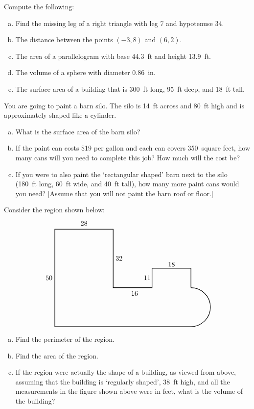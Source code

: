 \documentclass[11pt,letterpaper]{article}
\begin{document}

 Compute the following:
	\begin{enumerate}[(a)]
	\item Find the missing leg of a right triangle with leg 7 and hypotenuse 34.
	\item The distance between the points $(-3, 8)$ and $(6,2)$. 
	\item The area of a parallelogram with base 44.3~ft and height 13.9~ft. 
	\item The volume of a sphere with diameter 0.86~in.
	\item The surface area of a building that is 300~ft long, 95~ft deep, and 18~ft tall. 
	\end{enumerate}



\newpage



 You are going to paint a barn silo. The silo is 14~ft across and 80~ft high and is approximately shaped like a cylinder. 
	\begin{enumerate}[(a)]
	\item What is the surface area of the barn silo?
	\item If the paint can costs \$19 per gallon and each can covers 350~square feet, how many cans will you need to complete this job? How much will the cost be?
	\item If you were to also paint the `rectangular shaped' barn next to the silo (180~ft long, 60~ft wide, and 40~ft tall), how many more paint cans would you need? [Assume that you will not paint the barn roof or floor.]
	\end{enumerate} 



\newpage



 Consider the region shown below:
	\[
	\begin{tikzpicture}
	\draw[line width=0.03cm] (7,0) -- (0,0) -- (0,5) -- (3,5) -- (3,2) -- (5,2) -- (5,3) -- (7,3) -- (7,2);
	\draw[line width=0.03cm] (7,0) arc(270:450:1);
	
	\node at (-0.3,2.5) {$50$};
	\node at (1.5,5.3) {$28$};
	\node at (3.3,3.5) {$32$};
	\node at (4.75,2.5) {$11$};
	\node at (4.1,1.7) {$16$};
	\node at (6,3.2) {$18$};
	\end{tikzpicture}
	\]

\begin{enumerate}[(a)]
\item Find the perimeter of the region. 
\item Find the area of the region. 
\item If the region were actually the shape of a building, as viewed from above, assuming that the building is `regularly shaped', 38~ft high, and all the measurements in the figure shown above were in feet, what is the volume of the building?
\end{enumerate}
\end{document}
